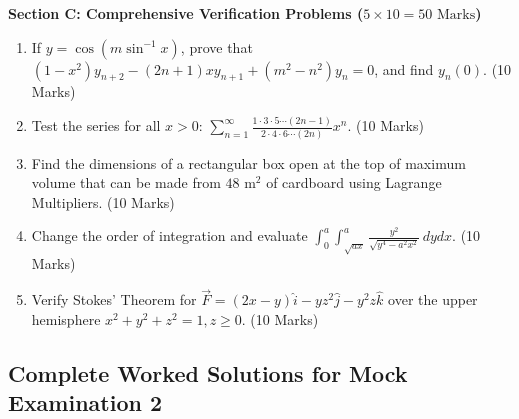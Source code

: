 \begin{mockexam}
\medskip
\noindent\textbf{Section C: Comprehensive Verification Problems ($5 \times 10 = 50\text{ Marks}$)}
\begin{enumerate}[leftmargin=1.5em, start=17]
    \item If $y = \cos(m\sin^{-1}x)$, prove that $(1-x^2)y_{n+2} - (2n+1)xy_{n+1} + (m^2-n^2)y_n = 0$, and find $y_n(0)$. (10 Marks)
    \item Test the series for all $x > 0$: $\sum_{n=1}^\infty \frac{1 \cdot 3 \cdot 5 \cdots (2n-1)}{2 \cdot 4 \cdot 6 \cdots (2n)} x^n$. (10 Marks)
    \item Find the dimensions of a rectangular box open at the top of maximum volume that can be made from $48\text{ m}^2$ of cardboard using Lagrange Multipliers. (10 Marks)
    \item Change the order of integration and evaluate $\int_0^a \int_{\sqrt{ax}}^a \frac{y^2}{\sqrt{y^4-a^2 x^2}}\,dy dx$. (10 Marks)
    \item Verify Stokes' Theorem for $\vec{F} = (2x-y)\hat{i} - yz^2\hat{j} - y^2 z\hat{k}$ over the upper hemisphere $x^2+y^2+z^2 = 1, z \ge 0$. (10 Marks)
\end{enumerate}
\end{mockexam}

\subsection{Complete Worked Solutions for Mock Examination 2}

